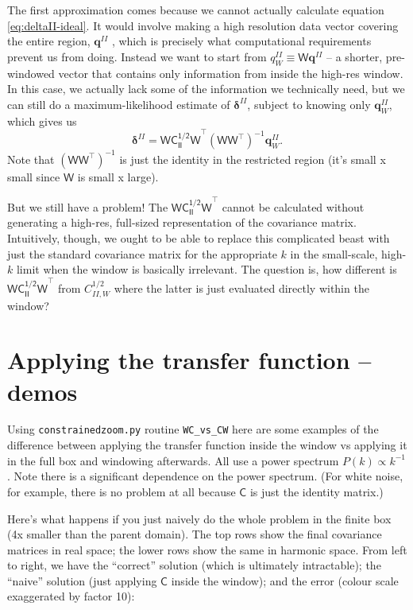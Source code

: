 \documentclass[11pt,a4paper,preprint]{aastex}
\newcommand{\bmath}[1]{\ensuremath{\bm{#1}}}
\renewcommand{\vec}[1]{\bmath{#1}}
\begin{document}
The first approximation comes because we cannot actually calculate
equation \eqref{eq:deltaII-ideal}. It would involve making a high
resolution data vector covering the entire region, $\vec{q}^{II}$ ,
which is precisely what computational requirements prevent us from
doing. Instead we want to start from $q^{II}_W \equiv
\mathsf{W}\vec{q}^{II}$ -- a shorter, pre-windowed vector that
contains only information from inside the high-res window. In this
case, we actually lack some of the information we technically need,
but we can still do a maximum-likelihood estimate of
$\vec{\delta}^{II}$, subject to knowing only $\vec{q}^{II}_W$, which
gives us
\begin{equation}
\vec{\delta}^{II} = \mathsf{WC_{II}^{1/2}W}^{\top} (\mathsf{WW}^{\top})^{-1} \vec{q}^{II}_W \textrm{.}
\end{equation}
Note that $(\mathsf{WW}^{\top})^{-1}$ is just the identity in the
restricted region (it's small x small since $\mathsf{W}$ is small x large).

But we still have a problem! The $\mathsf{WC_{II}^{1/2}W}^{\top}$
cannot be calculated without generating a high-res, full-sized
representation of the covariance matrix. Intuitively, though, we ought
to be able to replace this complicated beast with just the standard
covariance matrix for the appropriate $k$ in the small-scale, high-$k$
limit when the window is basically irrelevant. The question is, how
different is $\mathsf{WC_{II}^{1/2}W}^{\top}$ from $C_{II,W}^{1/2}$
where the latter is just evaluated directly within the window?


\section{Applying the transfer function -- demos}

Using {\tt constrainedzoom.py} routine {\tt WC\_vs\_CW} here are some
examples of the difference between applying the transfer function
inside the window vs applying it in the full box and windowing
afterwards. All use a power spectrum $P(k) \propto k^{-1}$. Note there
is a significant dependence on the power spectrum. (For white noise,
for example, there is no problem at all because $\mathsf{C}$ is just
the identity matrix.)

Here's what happens if you just naively do the whole problem in the
finite box (4x smaller than the parent domain). The top rows show the
final covariance matrices in real space; the lower rows show the same
in harmonic space. From left to right, we have the ``correct''
solution (which is ultimately intractable); the ``naive'' solution
(just applying $\mathsf{C}$ inside the window); and the error (colour
scale exaggerated by factor 10):
\end{document}
